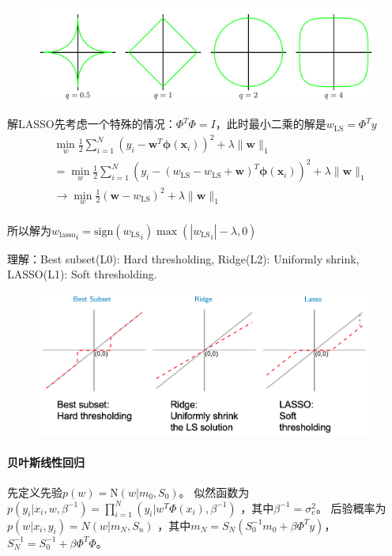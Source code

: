 \begin{figure}[H]
\centering
\includegraphics[width=0.7\columnwidth]{sl/1.png}
\end{figure}


解LASSO先考虑一个特殊的情况：$\Phi^T\Phi = I$，此时最小二乘的解是$w_\mathrm{LS} = \Phi^Ty$
\begin{equation}
\begin{aligned}
    &\min_w \frac{1}{2}\sum^N_{i=1}(y_i - \bm w^T\bm\phi(\bm x_i))^2 + \lambda\|\bm w\|_1 \\
    &=\! \min_w \frac{1}{2}\sum^N_{i=1}(y_i\! - (w_\mathrm{LS}\! - w_\mathrm{LS}\! +\! \bm w)^T\bm\phi(\bm x_i))^2\! +\! \lambda\|\bm w\|_1 \\
    &\to \min_w \frac{1}{2}(\bm w - w_\mathrm{LS})^2 + \lambda\|\bm w\|_1 \\
\end{aligned} 
\end{equation}

所以解为${w_\mathrm{lasso}}_i = \mathrm{sign}({w_\mathrm{LS}}_i) \max (|{w_\mathrm{LS}}_i| - \lambda, 0)$

理解：Best subset(L0): Hard thresholding,
Ridge(L2): Uniformly shrink,
LASSO(L1): Soft thresholding.

\begin{figure}[H]
\centering
\includegraphics[width=0.7\columnwidth]{sl/compare.png}
\end{figure}

\paragraph{贝叶斯线性回归} 
先定义先验$p(w) = \mathrm{N}(w|m_0, S_0)$。
似然函数为$p(y_i|x_i,w,\beta^{-1}) = \prod_{i=1}^{N}(y_i|w^T\Phi(x_i),\beta^{-1})$
，其中$\beta^{-1}=\sigma_e^2$。
后验概率为$p(w|x_i,y_i)=N(w|m_N,S_n)$
，其中$m_N=S_N(S_0^{-1}m_0+\beta\Phi^Ty)$，
$S_N^{-1}=S_0^{-1}+\beta\Phi^T\Phi$。

